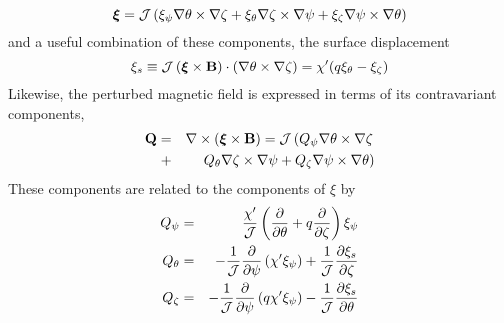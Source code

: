 \documentclass[prb,twocolumn,showpacs,preprintnumbers,amsmath,amssymb]{revtex4}
\renewcommand*{\v}[1]{\hbox{\bfseries #1}}
\newcommand{\vm}[1]{\mbox{\boldmath$#1$}}
\begin{document}
\begin{equation}
\vm{\xi} = {\cal J} \left( \xi_\psi \nabla \theta \times \nabla
	\zeta + \xi_\theta \nabla \zeta \times \nabla \psi + \xi_\zeta
	\nabla \psi \times \nabla \theta \right)
\label{eq:xi_vector}
\end{equation}
and a useful combination of these components, the surface displacement
\begin{equation}
\xi_s \equiv {\cal J} \left( \vm{\xi}
	\times \v{B} \right)  
	\cdot \left( \nabla \theta \times \nabla \zeta \right)
= \chi' (q \xi_\theta - \xi_\zeta)
\label{eq:xi_surface}
\end{equation}
Likewise, the perturbed magnetic field is expressed in terms of its
contravariant components,
\begin{eqnarray}
\v{Q}=&&\nabla \times (\vm{\xi} \times \v{B})
	= {\cal J} \left( Q_\psi \nabla \theta \times \nabla \zeta 
	\right. \nonumber \\
+&& \left. Q_\theta \nabla \zeta \times \nabla \psi
	+ Q_\zeta \nabla \psi \times \nabla \theta \right)
\label{eq:q_vector}
\end{eqnarray}
These components are related to the components of \vm{\xi} by
\begin{eqnarray}
Q_\psi =&& \frac{\chi'}{\cal J} \left( 
	\frac{\partial}{\partial \theta}
	+ q \frac{\partial}{\partial \zeta} \right) 
	\xi_\psi \nonumber \\
Q_\theta =&& - \frac{1}{\cal J}
	\frac{\partial}{\partial \psi}
	\left( \chi' \xi_\psi \right)
	+ \frac{1}{\cal J}
	\frac{\partial \xi_s}{\partial \zeta} \nonumber \\
Q_\zeta =&& - \frac{1}{\cal J}
	\frac{\partial}{\partial \psi}
	\left( q \chi' \xi_\psi \right)
	- \frac{1}{\cal J}
	\frac{\partial \xi_s}{\partial \theta} 
\label{eq:q_components}
\end{eqnarray}
\end{document}
